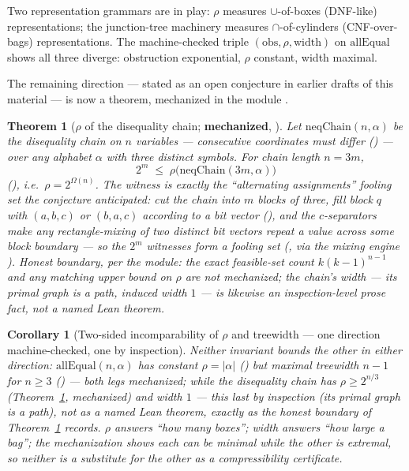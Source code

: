 \documentclass[11pt]{article}
\newtheorem{theorem}{Theorem}
\newtheorem{corollary}{Corollary}
\newcommand{\rectrho}{\rho}
\newcommand{\obs}{\mathrm{obs}}
\begin{document}
Two representation grammars are in play: $\rectrho$ measures
$\cup$-of-boxes (DNF-like) representations; the junction-tree
machinery measures $\cap$-of-cylinders (CNF-over-bags)
representations.  The machine-checked triple $(\obs, \rectrho,
\text{width})$ on $\mathrm{allEqual}$ shows all three diverge:
obstruction exponential, $\rectrho$ constant, width maximal.

The remaining direction --- stated as an open conjecture in earlier
drafts of this material --- is now a theorem, mechanized in the
module .

\begin{theorem}[$\rectrho$ of the disequality chain;
\textbf{mechanized}, ]
\label{thm:chainrho}
Let $\mathrm{neqChain}(n, \alpha)$ be the disequality chain on $n$
variables --- consecutive coordinates must differ
() --- over any alphabet $\alpha$ with three distinct
symbols.  For chain length $n = 3m$,
\[
  2^{m} \;\le\; \rectrho\bigl(\mathrm{neqChain}(3m, \alpha)\bigr)
\]
(), i.e.\ $\rectrho =
2^{\Omega(n)}$.  The witness is exactly the
``alternating assignments'' fooling set the conjecture anticipated:
cut the chain into $m$ blocks of three, fill block $q$ with
$(a,b,c)$ or $(b,a,c)$ according to a bit vector
(), and the $c$-separators make any
rectangle-mixing of two distinct bit vectors repeat a value across
some block boundary --- so the $2^m$ witnesses form a fooling set
(, via the mixing engine
).  \emph{Honest boundary, per the
module}: the exact feasible-set count $k(k-1)^{n-1}$ and any
matching upper bound on $\rectrho$ are \emph{not} mechanized; the
chain's width --- its primal graph is a path, induced width $1$ ---
is likewise an inspection-level prose fact, not a named Lean
theorem.
\end{theorem}

\begin{corollary}[Two-sided incomparability of $\rectrho$ and
treewidth --- one direction machine-checked, one by inspection]
\label{cor:incomparable}
Neither invariant bounds the other in either direction:
$\mathrm{allEqual}(n,\alpha)$ has constant $\rectrho = |\alpha|$
() but maximal treewidth $n-1$ for
$n \ge 3$ () --- both
legs mechanized; while the disequality chain has $\rectrho \ge
2^{n/3}$ (Theorem~\ref{thm:chainrho}, mechanized) and width $1$ ---
this last by inspection (its primal graph is a path), not as a named
Lean theorem, exactly as the honest boundary of
Theorem~\ref{thm:chainrho} records.  $\rectrho$ answers ``how many
boxes''; width answers ``how large a bag''; the mechanization shows
each can be minimal while the other is extremal, so neither is a
substitute for the other as a compressibility certificate.
\end{corollary}
\end{document}
